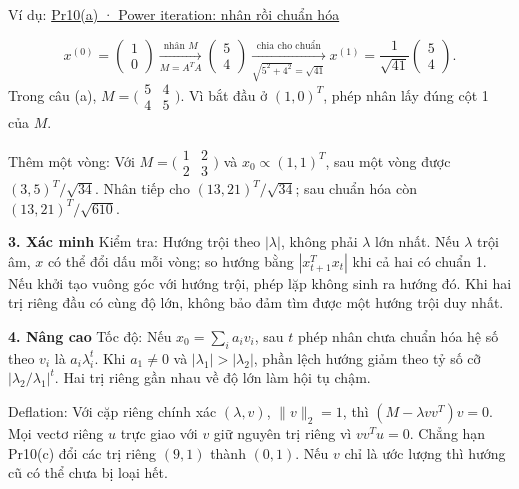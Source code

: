 \documentclass[10pt,a4paper,twocolumn]{article}
\newcommand{\key}[1]{#1:\enspace}
\newcommand{\blocklabel}[1]{\par\noindent#1\par\nobreak}
\newcommand{\qlink}[2]{\hyperref[question:#1]{#2}}
\newenvironment{example}[2]{%
  \par\addvspace{6pt}\noindent
  \raggedright
  \blocklabel{Ví dụ: \qlink{#1}{#2}}%
}{\par\addvspace{4pt}}
\newcommand{\unitheading}[2]{%
  \par\addvspace{1pt}\noindent\textbf{#1. #2}\enspace}
\newcommand{\unitverification}{\unitheading{3}{Xác minh}}
\newcommand{\unitadvanced}{\unitheading{4}{Nâng cao}}
\begin{document}
\begin{example}{Pr10}{Pr10(a) · Power iteration: nhân rồi chuẩn hóa}
\[
x^{(0)}=\begin{pmatrix}1\\0\end{pmatrix}
\xrightarrow[\scriptscriptstyle M=A^TA]{\text{nhân }M}
\begin{pmatrix}5\\4\end{pmatrix}
\xrightarrow[\scriptscriptstyle \sqrt{5^2+4^2}=\sqrt{41}]{\text{chia cho chuẩn}}
x^{(1)}=\frac{1}{\sqrt{41}}\begin{pmatrix}5\\4\end{pmatrix}.
\]
Trong câu (a), $M=\bigl(\begin{smallmatrix}5&4\\4&5\end{smallmatrix}\bigr)$. Vì bắt đầu ở $(1,0)^T$, phép nhân lấy đúng cột 1 của $M$.
\end{example}

\key{Thêm một vòng} Với $M=\bigl(\begin{smallmatrix}1&2\\2&3\end{smallmatrix}\bigr)$ và $x_0\propto(1,1)^T$, sau một vòng được $(3,5)^T/\sqrt{34}$. Nhân tiếp cho $(13,21)^T/\sqrt{34}$; sau chuẩn hóa còn $(13,21)^T/\sqrt{610}$.


\unitverification
\key{Kiểm tra} Hướng trội theo $|\lambda|$, không phải $\lambda$ lớn nhất. Nếu $\lambda$ trội âm, $x$ có thể đổi dấu mỗi vòng; so hướng bằng $|x_{t+1}^Tx_t|$ khi cả hai có chuẩn 1. Nếu khởi tạo vuông góc với hướng trội, phép lặp không sinh ra hướng đó. Khi hai trị riêng đầu có cùng độ lớn, không bảo đảm tìm được một hướng trội duy nhất.

\unitadvanced
\key{Tốc độ} Nếu $x_0=\sum_i a_i v_i$, sau $t$ phép nhân chưa chuẩn hóa hệ số theo $v_i$ là $a_i\lambda_i^t$. Khi $a_1\ne0$ và $|\lambda_1|>|\lambda_2|$, phần lệch hướng giảm theo tỷ số cỡ $|\lambda_2/\lambda_1|^t$. Hai trị riêng gần nhau về độ lớn làm hội tụ chậm.

\key{Deflation} Với cặp riêng chính xác $(\lambda,v)$, $\|v\|_2=1$, thì $(M-\lambda vv^T)v=0$. Mọi vectơ riêng $u$ trực giao với $v$ giữ nguyên trị riêng vì $vv^Tu=0$. Chẳng hạn Pr10(c) đổi các trị riêng $(9,1)$ thành $(0,1)$. Nếu $v$ chỉ là ước lượng thì hướng cũ có thể chưa bị loại hết.
\end{document}
